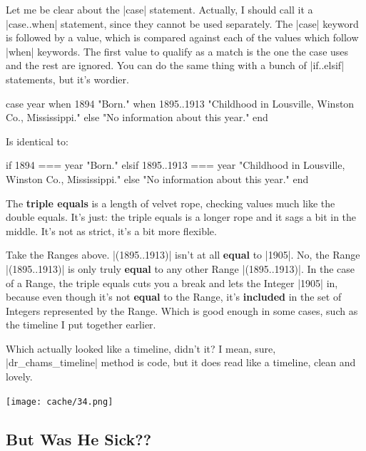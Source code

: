 \documentclass[12pt,twoside]{report}
\begin{document}
Let me be clear about the \rubyinline|case| statement.
Actually, I should call it a \rubyinline|case..when|
statement, since they cannot be used separately.  The
\rubyinline|case| keyword is followed by a value,
which is compared against each of the values which follow
\rubyinline|when| keywords.  The first value to
qualify as a match is the one the case uses and the rest are ignored.
You can do the same thing with a bunch of
\rubyinline|if..elsif| statements, but it's wordier.


\begin{rubycode}

 case year
 when 1894
   "Born."
 when 1895..1913
   "Childhood in Lousville, Winston Co., Mississippi."
 else
   "No information about this year."
 end

\end{rubycode}


Is identical to:


\begin{rubycode}

 if 1894 === year
   "Born."
 elsif 1895..1913 === year
   "Childhood in Lousville, Winston Co., Mississippi."
 else
   "No information about this year."
 end

\end{rubycode}


The {\bf triple equals} is a length of velvet rope, checking values
much like the double equals.  It's just: the triple equals is a longer
rope and it sags a bit in the middle.  It's not as strict, it's a bit
more flexible.

Take the Ranges above.  \rubyinline|(1895..1913)|
isn't at all {\bf equal} to \rubyinline|1905|.  No,
the Range \rubyinline|(1895..1913)| is only truly {\bf
  equal} to any other Range \rubyinline|(1895..1913)|.
In the case of a Range, the triple equals cuts you a break and lets
the Integer \rubyinline|1905| in, because even though
it's not {\bf equal} to the Range, it's {\bf included} in the set of
Integers represented by the Range.  Which is good enough in some
cases, such as the timeline I put together earlier.

Which actually looked like a timeline, didn't it?  I mean, sure,
\rubyinline|dr_chams_timeline| method is code, but it
does read like a timeline, clean and lovely.

\newpage

	\texttt{[image: cache/34.png]}


\subsection{But Was He Sick??}
\end{document}
